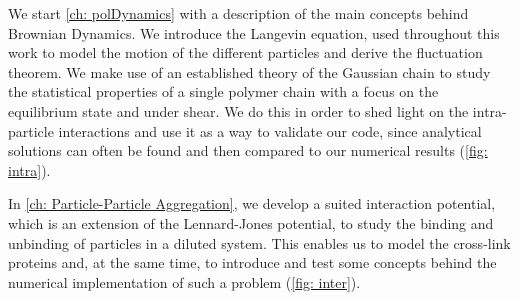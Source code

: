 \documentclass[../../main.tex]{subfiles}
\begin{document}
    We start \cref{ch: polDynamics} with a description of the main concepts behind Brownian Dynamics. We introduce the Langevin equation, used throughout this work to model the motion of the different particles and derive the fluctuation theorem. We make use of an established theory of the Gaussian chain to study the statistical properties of a single polymer chain with a focus on the equilibrium state and under shear. We do this in order to shed light on the intra-particle interactions and use it as a way to validate our code, since analytical solutions can often be found and then compared to our numerical results (\cref{fig: intra}).
%

    
    In \cref{ch: Particle-Particle Aggregation}, we develop a suited interaction potential, which is an extension of the Lennard-Jones potential, to study the binding and unbinding of particles in a diluted system. This enables us to model the cross-link proteins and, at the same time, to introduce and test some concepts behind the numerical implementation of such a problem (\cref{fig: inter}). 
    
\end{document}
